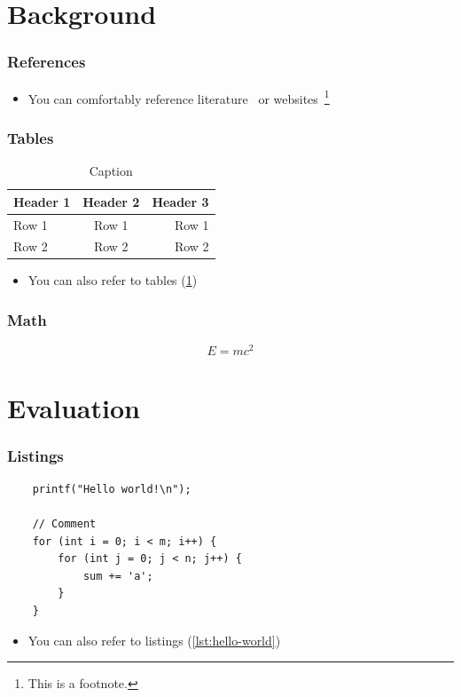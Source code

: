 \documentclass[
	aspectratio=169,
	compress,
	usepdftitle=false,
]{beamer}
\newcommand{\navframetitle}[1]{\frametitle{#1\hfill{\footnotesize\lastsection{}}}}
\begin{document}
\section{Background}
\label{sec:background}

\begin{frame}
	\navframetitle{References}

	\begin{itemize}
		\item You can comfortably reference literature~\cite{DBLP:journals/superfri/DuweLMSF0B020} or websites~\cite{WWW:ParCIO-Blog}\footnote{This is a footnote.}
	\end{itemize}
\end{frame}

\begin{frame}
	\navframetitle{Tables}

	\begin{table}[H]
		\centering
		\begin{tabular}{|l|c|r|}
			\hline
			\textbf{Header 1} & \textbf{Header 2} & \textbf{Header 3} \\
			\hline
			\hline
			Row 1 & Row 1 & Row 1 \\
			Row 2 & Row 2 & Row 2 \\
			\hline
		\end{tabular}
		\caption{Caption}
		\label{tab:table}
	\end{table}

	\begin{itemize}
		\item You can also refer to tables (\cref{tab:table})
	\end{itemize}
\end{frame}

\begin{frame}
	\navframetitle{Math}

	\[
		E = m c^2
	\]
\end{frame}

\section{Evaluation}
\label{sec:evaluation}

\begin{frame}[fragile]
	\navframetitle{Listings}

	\begin{listing}[H]
	\begin{verbatim}
	printf("Hello world!\n");

	// Comment
	for (int i = 0; i < m; i++) {
		for (int j = 0; j < n; j++) {
			sum += 'a';
		}
	}
	\end{verbatim}
	\caption{Caption}
	\label{lst:hello-world}
	\end{listing}

	\begin{itemize}
		\item You can also refer to listings (\cref{lst:hello-world})
	\end{itemize}
\end{frame}
\end{document}
